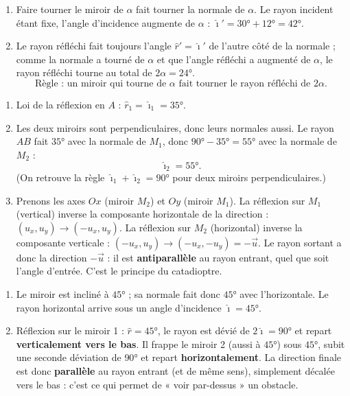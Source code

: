 \documentclass[11pt,a4paper]{article}
\newcommand{\vv}[1]{\vec{#1}}\newcommand{\ds}{\displaystyle}
\begin{document}
\begin{corrige}
\begin{enumerate}[label=\alph*)]
  \item Faire tourner le miroir de $\alpha$ fait tourner la normale de $\alpha$. Le rayon incident
        étant fixe, l'angle d'incidence augmente de $\alpha$ : $\hat{\imath}'=\ang{30}+\ang{12}=\ang{42}$.
  \item Le rayon réfléchi fait toujours l'angle $\hat{r}'=\hat{\imath}'$ de l'autre côté de la normale ;
        comme la normale a tourné de $\alpha$ et que l'angle réfléchi a augmenté de $\alpha$, le rayon
        réfléchi tourne au total de $2\alpha=\ang{24}$.
        \[ \boxed{\text{Règle : un miroir qui tourne de }\alpha\text{ fait tourner le rayon réfléchi de }2\alpha.} \]
\end{enumerate}
\end{corrige}

\begin{corrige}
\begin{enumerate}[label=\alph*)]
  \item Loi de la réflexion en $A$ : $\hat{r}_1=\hat{\imath}_1=\ang{35}$.
  \item Les deux miroirs sont perpendiculaires, donc leurs normales aussi. Le rayon $AB$ fait
        $\ang{35}$ avec la normale de $M_1$, donc $\ang{90}-\ang{35}=\ang{55}$ avec la normale de $M_2$ :
        \[ \hat{\imath}_2=\ang{55}. \]
        (On retrouve la règle $\hat{\imath}_1+\hat{\imath}_2=\ang{90}$ pour deux miroirs perpendiculaires.)
  \item Prenons les axes $Ox$ (miroir $M_2$) et $Oy$ (miroir $M_1$). La réflexion sur $M_1$ (vertical)
        inverse la composante horizontale de la direction : $(u_x,u_y)\to(-u_x,u_y)$. La réflexion sur
        $M_2$ (horizontal) inverse la composante verticale : $(-u_x,u_y)\to(-u_x,-u_y)=-\vv{u}$. Le rayon
        sortant a donc la direction $-\vv{u}$ : il est \textbf{antiparallèle} au rayon entrant, quel que
        soit l'angle d'entrée. C'est le principe du catadioptre.
\end{enumerate}
\end{corrige}

\begin{corrige}[le périscope]
\begin{enumerate}[label=\alph*)]
  \item Le miroir est incliné à $\ang{45}$ ; sa normale fait donc $\ang{45}$ avec l'horizontale. Le
        rayon horizontal arrive sous un angle d'incidence $\hat{\imath}=\ang{45}$.
  \item Réflexion sur le miroir 1 : $\hat{r}=\ang{45}$, le rayon est dévié de $2\hat{\imath}=\ang{90}$
        et repart \textbf{verticalement vers le bas}. Il frappe le miroir 2 (aussi à $\ang{45}$) sous
        $\ang{45}$, subit une seconde déviation de $\ang{90}$ et repart \textbf{horizontalement}. La
        direction finale est donc \textbf{parallèle} au rayon entrant (et de même sens), simplement
        décalée vers le bas : c'est ce qui permet de « voir par-dessus » un obstacle.
\end{enumerate}
\end{corrige}
\end{document}
